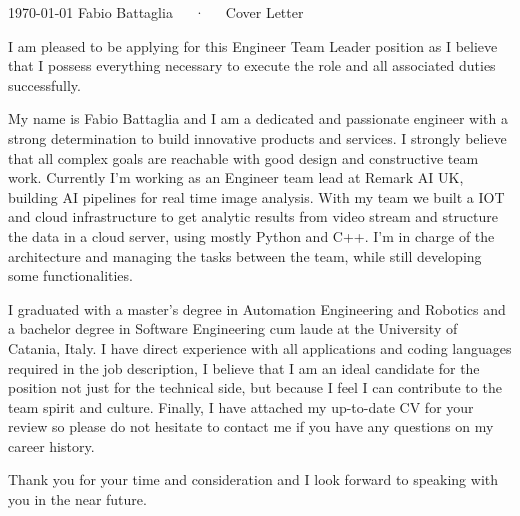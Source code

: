 \documentclass[11pt, a4paper]{awesome-cv}
\begin{document}
\makecvheader[R]

\makecvfooter
  {\today}
  {Fabio Battaglia~~~·~~~Cover Letter}
  {}

\makelettertitle

\begin{cvletter}
I am pleased to be applying for this Engineer Team Leader position as I believe
that I possess everything necessary to execute the role and all associated duties successfully.

My name is Fabio Battaglia and I am a dedicated and passionate engineer with a strong determination
to build innovative products and services. I strongly believe that all complex goals are reachable
with good design and constructive team work. Currently I'm working as an Engineer team lead at Remark AI UK,
building AI pipelines for real time image analysis. With my team we built a IOT and cloud infrastructure
to get analytic results from video stream and structure the data in a cloud server, using mostly
Python and C++. I'm in charge of
the architecture and managing the tasks between the team, while still developing some functionalities.

I graduated with a master's degree in Automation Engineering and Robotics and a bachelor degree
in Software Engineering cum laude at the University of Catania, Italy.
I have direct experience with all applications and coding languages required in the job description,
I believe that I am an ideal candidate for the position not just for the technical side, but because I feel
I can contribute to the team spirit and culture.
Finally, I have attached my up-to-date CV for your review so please do not hesitate to contact me
if you have any questions on my career history.


Thank you for your time and consideration and I look forward to speaking with you in the near future.

\end{cvletter}


\makeletterclosing
\end{document}
